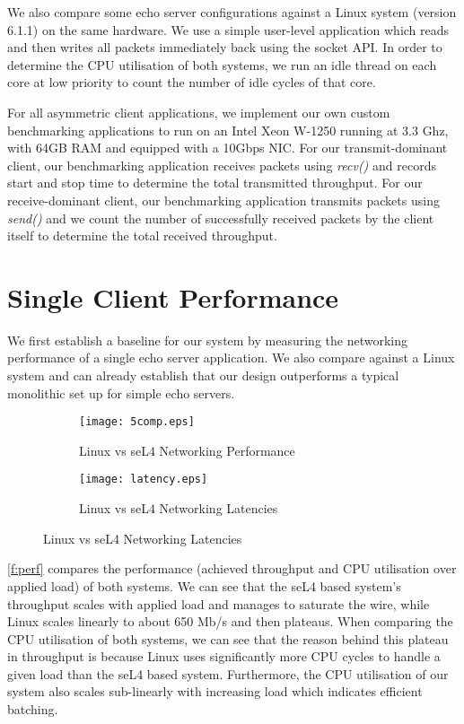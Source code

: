 We also compare some echo server configurations against a Linux system (version 6.1.1) on the same hardware. 
We use a simple user-level application which reads and then writes all packets immediately back using the socket API. 
In order to determine the CPU utilisation of both systems, we run an idle thread on each core
at low priority to count the number of idle cycles of that core. 

For all asymmetric client applications, we implement our own custom benchmarking applications to run on an Intel Xeon W-1250
running at 3.3 Ghz, with 64GB RAM and equipped with a 10Gbps NIC. For our transmit-dominant client, our benchmarking
application receives packets using \emph{recv()} and records start and stop time to determine the total transmitted
throughput. For our receive-dominant client, our benchmarking application transmits packets using \emph{send()} and
we count the number of successfully received packets by the client itself to determine the total received throughput.

\section{Single Client Performance}

We first establish a baseline for our system by measuring the networking performance of a single echo server application. 
We also compare against a Linux system and can already establish that our design outperforms a typical monolithic set up 
for simple echo servers. 

\noindent\begin{figure}[H]
    \centering
	\begin{multicols}{2}
		\begin{subfigure}[b]{0.45\textwidth}
        \centering
        \texttt{[image: 5comp.eps]}
        \caption{Linux vs seL4 Networking Performance}
        \label{f:perf}
    \end{subfigure}\qquad
    \begin{subfigure}[b]{0.45\textwidth}
        \centering
        \vspace{0.15cm}
        \texttt{[image: latency.eps]}
        \caption{Linux vs seL4 Networking Latencies}
        \label{f:perf_latencies}
    \end{subfigure}
\end{multicols}
\end{figure}

\autoref{f:perf} compares the performance (achieved throughput and CPU utilisation over applied load) of both systems. 
We can see that the seL4 based system's throughput scales with applied load and manages to saturate the wire, while
Linux scales linearly to about 650 Mb/s and then plateaus. When comparing the CPU utilisation of both systems, we
can see that the reason behind this plateau in throughput is because Linux uses significantly more CPU cycles 
to handle a given load than the seL4 based system. Furthermore, the CPU utilisation of our system also scales 
sub-linearly with increasing load which indicates efficient batching.

